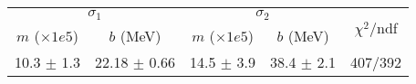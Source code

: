\begin{tabular}{cc|cc||c}
\multicolumn{2}{c|}{$\sigma_1$} & \multicolumn{2}{|c}{$\sigma_2$}  & \multirow{2}{*}{$\chi^2/$ndf}\\
$m$ ($\times1e5$) & $b$ (MeV) & $m$ ($\times1e5$) & $b$ (MeV)  & \\
\hline
10.3 $\pm$ 1.3 & 22.18 $\pm$ 0.66 & 14.5 $\pm$ 3.9 & 38.4 $\pm$ 2.1 & 407/392\\
\end{tabular}

